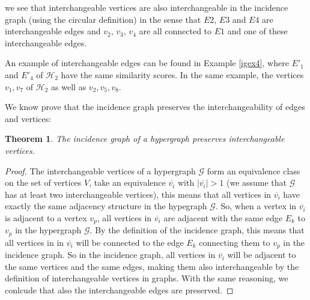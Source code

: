 \documentclass[a4paper,11pt]{report}
\newtheorem{theorem}{Theorem}[section]
\newcommand{\hgraf}{\mathcal{G}}
\newcommand{\hgrafeen}{\mathcal{H}}
\begin{document}
\begin{itemize}
\begin{center}
\end{center}
 we see that interchangeable vertices are also 
  interchangeable in the incidence graph (using the circular definition) in the sense that $E2$, $E3$ and $E4$ are interchangeable edges and
  $v_2$, $v_3$, $v_4$ are all connected to $E1$ and one of these interchangeable edges.
  
  An example of interchangeable edges can be found in Example \ref{igex4}, where 
  $E'_1$ and $E'_4$ of $\hgrafeen_2$ have the same similarity scores. In the same 
  example, the vertices $v_1, v_7$ of $\hgrafeen_2$ as well as $v_2, v_5, v_8$.

We know prove that the incidence graph preserves the interchangeability of edges and 
vertices:
\begin{theorem}
   The incidence graph of a hypergraph preserves interchangeable vertices. \end{theorem}
 \begin{proof}
   The interchangeable vertices of a hypergraph $\hgraf$ form an equivalence class on the set of vertices
   $V$, take an equivalence $\overline{v_i}$ with $|\overline{v_i}| > 1$ (we assume that $\hgraf$ has at least two interchangeable vertices),
   this means that all vertices in $\overline{v_i}$ have exactly the same adjacency structure in the hypegraph $\hgraf$.  
   So, when a vertex in $\overline{v_i}$ is adjacent to a vertex $v_p$, all 
   vertices in $\overline{v_i}$ are adjacent with the same edge $E_k$ to $v_p$ in the hypergraph 
   $\hgraf$. By the definition of the incidence graph, this means that all vertices in 
   in $\overline{v_i}$ will be connected to the edge $E_k$ connecting them to $v_p$ in the 
   incidence graph.  So in the incidence graph, all vertices in $\overline{v_i}$ will be adjacent to 
  the same vertices and the same edges, making them also interchangeable by the definition of interchangeable vertices in graphs. With the same reasoning, we conlcude
  that also the interchangeable edges are preserved.  
   
 \end{proof}




\end{itemize}
\end{document}
